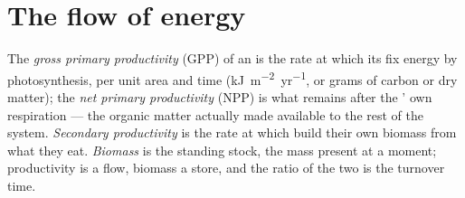 \section{The flow of energy}

\begin{definition}[Productivity]\label{def:b1:ecosystem-organization:productivity}
The \emph{gross primary productivity} (GPP) of an  is the
rate at which its  fix energy by photosynthesis, per unit
area and time (\unit{kJ.m^{-2}.yr^{-1}}, or grams of carbon or dry
matter); the \emph{net primary productivity} (NPP) is what remains
after the ' own respiration --- the organic matter actually
made available to the rest of the system. \emph{Secondary
productivity} is the rate at which  build their own biomass
from what they eat. \emph{Biomass} is the standing stock, the mass
present at a moment; productivity is a flow, biomass a store, and
the ratio of the two is the turnover time.
\end{definition}

